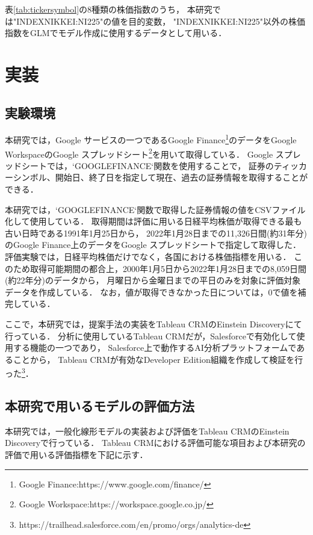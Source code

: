 \documentclass[submit,techrep,noauthor]{ipsj}
\begin{document}
表\ref{tab:tickersymbol}の8種類の株価指数のうち，
本研究では"INDEXNIKKEI:NI225"の値を目的変数，
"INDEXNIKKEI:NI225"以外の株価指数をGLMでモデル作成に使用するデータとして用いる．

\newpage
\section{実装}

\subsection{実験環境}\label{experiment}
本研究では，Google サービスの一つであるGoogle Finance\footnote{Google Finance:https://www.google.com/finance/}のデータをGoogle WorkspaceのGoogle スプレッドシート\footnote{Google Workspace:https://workspace.google.co.jp/}を用いて取得している．
Google スプレッドシートでは，`GOOGLEFINANCE`関数を使用することで，
証券のティッカーシンボル、開始日、終了日を指定して現在、過去の証券情報を取得することができる．

本研究では，`GOOGLEFINANCE`関数で取得した証券情報の値をCSVファイル化して使用している．
%
取得期間は評価に用いる日経平均株価が取得できる最も古い日時である1991年1月25日から，
2022年1月28日までの11,326日間(約31年分)のGoogle Finance上のデータをGoogle スプレッドシートで指定して取得した．
%
評価実験では，日経平均株価だけでなく，各国における株価指標を用いる．
このため取得可能期間の都合上，2000年1月5日から2022年1月28日までの8,059日間(約22年分)のデータから，
月曜日から金曜日までの平日のみを対象に評価対象データを作成している．
なお，値が取得できなかった日については，0で値を補完している．

ここで，本研究では，提案手法の実装をTableau CRMのEinstein Discoveryにて行っている．
分析に使用しているTableau CRMだが，Salesforceで有効化して使用する機能の一つであり，
Salesforce上で動作するAI分析プラットフォームであることから，
Tableau CRMが有効なDeveloper Edition組織を作成して検証を行った\footnote{\scriptsize{https://trailhead.salesforce.com/en/promo/orgs/analytics-de}}．

\subsection{本研究で用いるモデルの評価方法}
本研究では，一般化線形モデルの実装および評価をTableau CRMのEinstein Discoveryで行っている．
Tableau CRMにおける評価可能な項目および本研究の評価で用いる評価指標を下記に示す．
\end{document}
